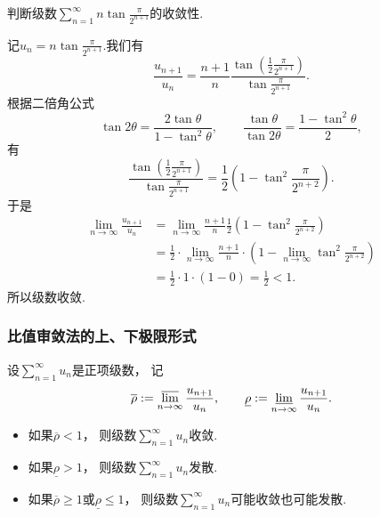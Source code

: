\begin{example}
判断级数\(\sum_{n=1}^\infty n \tan\frac{\pi}{2^{n+1}}\)的收敛性.
\begin{solution}
记\(u_n = n \tan\frac{\pi}{2^{n+1}}\).我们有\[
	\frac{u_{n+1}}{u_n}
	= \frac{n+1}{n} \frac{\tan(\frac{1}{2}\frac{\pi}{2^{n+1}})}{\tan\frac{\pi}{2^{n+1}}}.
\]
根据二倍角公式\[
	\tan2\theta = \frac{2\tan\theta}{1-\tan^2\theta},
	\qquad
	\frac{\tan\theta}{\tan2\theta} = \frac{1-\tan^2\theta}{2},
\]
有\[
	\frac{\tan(\frac{1}{2}\frac{\pi}{2^{n+1}})}{\tan\frac{\pi}{2^{n+1}}}
	= \frac{1}{2} \left(
		1-\tan^2\frac{\pi}{2^{n+2}}
	\right).
\]
于是\begin{align*}
	\lim_{n\to\infty} \frac{u_{n+1}}{u_n}
	&= \lim_{n\to\infty} \frac{n+1}{n} \frac{1}{2} \left(
		1-\tan^2\frac{\pi}{2^{n+2}}
	\right) \\
	&= \frac{1}{2} \cdot \lim_{n\to\infty} \frac{n+1}{n} \cdot \left(
		1 - \lim_{n\to\infty} \tan^2\frac{\pi}{2^{n+2}}
	\right) \\
	&= \frac{1}{2} \cdot 1 \cdot (1 - 0) = \frac{1}{2} < 1.
\end{align*}
所以级数收敛.
\end{solution}
\end{example}

\subsubsection{比值审敛法的上、下极限形式}
\begin{corollary}\label{theorem:无穷级数.正项级数的比值审敛法的上下极限形式}
\def\orho{\overline{\rho}}
\def\urho{\underline{\rho}}
设\(\sum_{n=1}^\infty u_n\)是正项级数，
记\[
	\orho
	\defeq
	\varlimsup_{n\to\infty} \frac{u_{n+1}}{u_n},
	\qquad
	\urho
	\defeq
	\varliminf_{n\to\infty} \frac{u_{n+1}}{u_n}.
\]
\begin{itemize}
	\item 如果\(\orho < 1\)，
	则级数\(\sum_{n=1}^\infty u_n\)收敛.

	\item 如果\(\urho > 1\)，
	则级数\(\sum_{n=1}^\infty u_n\)发散.

	\item 如果\(\orho \geq 1\)或\(\urho \leq 1\)，
	则级数\(\sum_{n=1}^\infty u_n\)可能收敛也可能发散.
\end{itemize}
\end{corollary}

